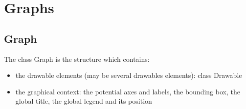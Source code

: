 

\newpage

\section{Graphs}


\subsection{Graph}

The class Graph is the structure which contains:
\begin{itemize}
\item the drawable elements (may be several drawables elements): class Drawable
\item the graphical context: the potential axes and labels, the bounding box, the global title, the global legend and its position
\end{itemize}



